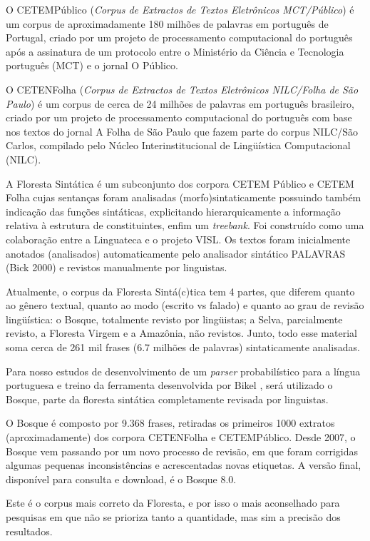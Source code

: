 O CETEMPúblico (\emph{Corpus de Extractos de Textos Eletrônicos MCT/Público}) é um corpus de aproximadamente 180 milhões de palavras em português de Portugal, criado por um projeto de processamento computacional do português após a assinatura de um protocolo entre o Ministério da Ciência e Tecnologia português (MCT) e o jornal O Público.

O CETENFolha (\emph{Corpus de Extractos de Textos Eletrônicos NILC/Folha de São Paulo}) é um corpus de cerca de 24 milhões de palavras em português brasileiro, criado por um projeto de processamento computacional do português com base nos textos do jornal A Folha de São Paulo que fazem parte do corpus NILC/São Carlos, compilado pelo Núcleo Interinstitucional de Lingüística Computacional (NILC).

A Floresta Sintática é um subconjunto dos corpora CETEM Público e CETEM Folha cujas sentanças foram analisadas (morfo)sintaticamente possuindo também indicação das funções sintáticas, explicitando hierarquicamente a informação relativa à estrutura de constituintes, enfim um \emph{treebank}. Foi construído como uma colaboração entre a Linguateca e o projeto VISL. Os textos foram inicialmente anotados (analisados) automaticamente pelo analisador sintático PALAVRAS (Bick 2000) e revistos manualmente por linguistas.

Atualmente, o corpus da Floresta Sintá(c)tica tem 4 partes, que diferem quanto ao gênero textual, quanto ao modo (escrito vs falado) e quanto ao grau de revisão lingüística: o Bosque, totalmente revisto por lingüistas; a Selva, parcialmente revisto, a Floresta Virgem e a Amazônia, não revistos. Junto, todo esse material soma cerca de 261 mil frases (6.7 milhões de palavras) sintaticamente analisadas.

Para nosso estudos de desenvolvimento de um \emph{parser} probabilístico para a língua portuguesa e treino da ferramenta desenvolvida por Bikel , será utilizado o Bosque, parte da floresta sintática completamente revisada por linguistas.

O Bosque é composto por 9.368 frases, retiradas os primeiros 1000 extratos (aproximadamente) dos corpora CETENFolha e CETEMPúblico. Desde 2007, o Bosque vem passando por um novo processo de revisão, em que foram corrigidas algumas pequenas inconsistências e acrescentadas novas etiquetas. A versão final, disponível para consulta e download, é o Bosque 8.0.

Este é o corpus mais correto da Floresta, e por isso o mais aconselhado para pesquisas em que não se prioriza tanto a quantidade, mas sim a precisão dos resultados.

